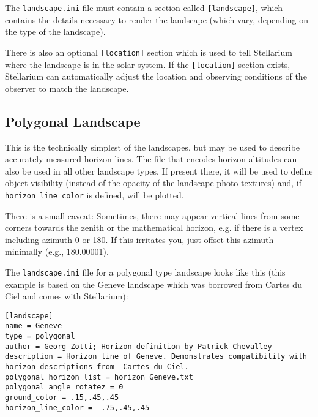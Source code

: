The \texttt{landscape.ini} file must contain a section called
\texttt{{[}landscape{]}}, which contains the details necessary to render
the landscape (which vary, depending on the type of the landscape).

There is also an optional \texttt{{[}location{]}} section which is used
to tell Stellarium where the landscape is in the solar system. If the
\texttt{{[}location{]}} section exists, Stellarium can automatically
adjust the location and observing conditions of the observer to match
the landscape.

\subsection{Polygonal Landscape}\label{polygonal-line-method}

This is the technically simplest of the landscapes, but may be used to
describe accurately measured horizon lines. The file that encodes
horizon altitudes can also be used in all other landscape types. If
present there, it will be used to define object visibility (instead of
the opacity of the landscape photo textures) and, if
\texttt{horizon\_line\_color} is defined, will be plotted.

There is a small caveat: Sometimes, there may appear vertical lines from
some corners towards the zenith or the mathematical horizon, e.g. if
there is a vertex including azimuth 0 or 180. If this irritates you,
just offset this azimuth minimally (e.g., 180.00001).

The \texttt{landscape.ini} file for a polygonal type landscape looks
like this (this example is based on the Geneve landscape which was
borrowed from Cartes du Ciel and comes with Stellarium):

\begin{config}
\texttt{{[}landscape{]}}\\
\texttt{name~=~Geneve}\\
\texttt{type~=~polygonal}\\
\texttt{author~=~Georg~Zotti;~Horizon~definition~by~Patrick~Chevalley}\\
\texttt{description~=~Horizon~line~of~Geneve.~Demonstrates~compatibility~with~horizon~descriptions~from~~Cartes~du~Ciel.}\\
\texttt{polygonal\_horizon\_list~=~horizon\_Geneve.txt}\\
\texttt{polygonal\_angle\_rotatez~=~0}\\
\texttt{ground\_color~=~.15,.45,.45}\\
\texttt{horizon\_line\_color~=~~.75,.45,.45}
\end{config}

